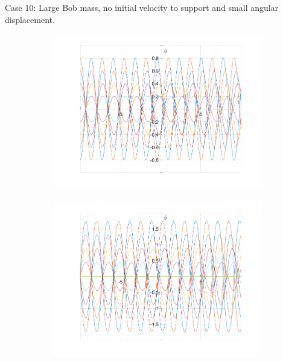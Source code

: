 \documentclass{article}
\begin{document}
	Case 10:
	Large Bob mass, no initial velocity to support and small angular displacement.	
			\begin{figure}[h!]
		\centering
		\begin{subfigure}[b]{0.48\linewidth}
			\includegraphics[width=\linewidth]{./SmallOscillations/S10/F1.png}
		\end{subfigure}
		\begin{subfigure}[b]{0.48\linewidth}
			\includegraphics[width=\linewidth]{./SmallOscillations/S10/F2.png}
		\end{subfigure}
	\end{figure}
\end{document}
